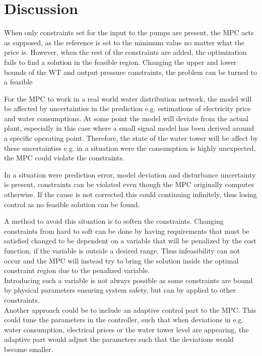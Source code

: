 \chapter{Discussion}
\label{Discussion}

When only constraints set for the input to the pumps are present, the MPC acts as supposed, as the reference is set to the minimum value no matter what the price is. However, when the rest of the constraints are added, the optimization fails to find a solution in the feasible region. Changing the upper and lower bounds of the WT and output pressure constraints, the problem can be turned to a feasible 

For the MPC to work in a real world water distribution network, the model will be affected by uncertainties in the prediction e.g. estimations of electricity price and water consumptions. At some point the model will deviate from the actual plant, especially in this case where a small signal model has been derived around a specific operating point. Therefore, the state of the water tower will be affect by these uncertainties e.g. in a situation were the consumption is highly unexpected, the MPC could violate the constraints.

In a situation were prediction error, model deviation and disturbance uncertainty is present, constraints can be violated even though the MPC originally computes otherwise. If the cause is not corrected this could continuing infinitely, thus losing control as no feasible solution can be found. 

A method to avoid this situation is to soften the constraints. Changing constraints from hard to soft can be done by having requirements that must be satisfied changed to be dependent on a variable that will be penalized by the cost function, if the variable is outside a desired range. Thus infeasibility can not occur and the MPC will instead try to bring the solution inside the optimal constraint region due to the penalized variable.\\   
Introducing such a variable is not always possible as some constraints are bound by physical parameters ensuring system safety, but can by applied to other constraints.\\

Another approach could be to include an adaptive control part to the MPC. This could tune the parameters in the controller, such that when deviations in e.g. water consumption, electrical prices or the water tower level are appearing, the adaptive part would adjust the parameters such that the deviations would become smaller.




